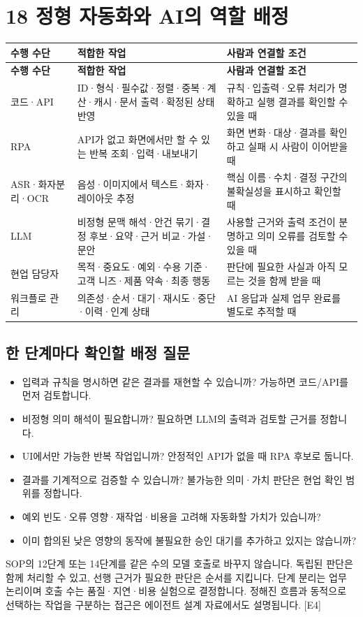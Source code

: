 \documentclass[a4paper,10pt]{article}
\newcommand{\Hline}{\noalign{\hrule height 1.5pt}}
\begin{document}
\section*{18 정형 자동화와 AI의 역할 배정}
{\fontsize{9.2}{13.616}\selectfont
\begin{longtable}{!{\vrule width 1.5pt}L{31.56mm}|L{66.28mm}|L{59.96mm}!{\vrule width 1.5pt}}
\Hline{} \textbf{수행 수단} & \textbf{적합한 작업} & \textbf{사람과 연결할 조건}\\\hline\endfirsthead
\Hline{} \textbf{수행 수단} & \textbf{적합한 작업} & \textbf{사람과 연결할 조건}\\\hline\endhead
\hline\endfoot\Hline\endlastfoot
코드·API & ID·형식·필수값·정렬·중복·계산·캐시·문서 출력·확정된 상태 반영 & 규칙·입출력·오류 처리가 명확하고 실행 결과를 확인할 수 있을 때\\\hline
RPA & API가 없고 화면에서만 할 수 있는 반복 조회·입력·내보내기 & 화면 변화·대상·결과를 확인하고 실패 시 사람이 이어받을 때\\\hline
ASR·화자분리·OCR & 음성·이미지에서 텍스트·화자·레이아웃 추정 & 핵심 이름·수치·결정 구간의 불확실성을 표시하고 확인할 때\\\hline
LLM & 비정형 문맥 해석·안건 묶기·결정 후보·요약·근거 비교·가설·문안 & 사용할 근거와 출력 조건이 분명하고 의미 오류를 검토할 수 있을 때\\\hline
현업 담당자 & 목적·중요도·예외·수용 기준·고객 니즈·제품 약속·최종 행동 & 판단에 필요한 사실과 아직 모르는 것을 함께 받을 때\\\hline
워크플로 관리 & 의존성·순서·대기·재시도·중단·이력·인계 상태 & AI 응답과 실제 업무 완료를 별도로 추적할 때\\\hline
\end{longtable}}
\subsection*{한 단계마다 확인할 배정 질문}
\begin{itemize}
\item 입력과 규칙을 명시하면 같은 결과를 재현할 수 있습니까? 가능하면 코드/API를 먼저 검토합니다.
\item 비정형 의미 해석이 필요합니까? 필요하면 LLM의 출력과 검토할 근거를 정합니다.
\item UI에서만 가능한 반복 작업입니까? 안정적인 API가 없을 때 RPA 후보로 둡니다.
\item 결과를 기계적으로 검증할 수 있습니까? 불가능한 의미·가치 판단은 현업 확인 범위를 정합니다.
\item 예외 빈도·오류 영향·재작업·비용을 고려해 자동화할 가치가 있습니까?
\item 이미 합의된 낮은 영향의 동작에 불필요한 승인 대기를 추가하고 있지는 않습니까?
\end{itemize}
SOP의 12단계 또는 14단계를 같은 수의 모델 호출로 바꾸지 않습니다. 독립된 판단은 함께 처리할 수 있고, 선행 근거가 필요한 판단은 순서를 지킵니다. 단계 분리는 업무 논리이며 호출 수는 품질·지연·비용 실험으로 결정합니다. 정해진 흐름과 동적으로 선택하는 작업을 구분하는 접근은 에이전트 설계 자료에서도 설명됩니다. [E4]
\end{document}
